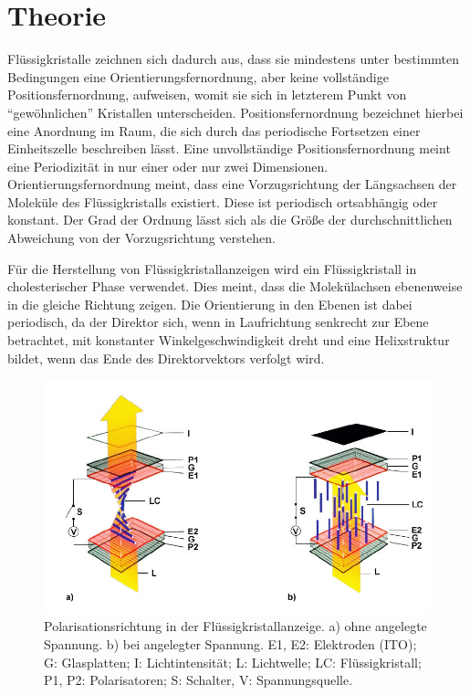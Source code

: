 \documentclass[
	a4paper,
	12pt,
	pagesize,
	ngerman
]{scrartcl}
\begin{document}
	\section{Theorie}
	Flüssigkristalle zeichnen sich dadurch aus, dass sie mindestens unter bestimmten Bedingungen eine Orientierungsfernordnung, aber keine vollständige Positionsfernordnung, aufweisen, womit sie sich in letzterem Punkt von \enquote{gewöhnlichen} Kristallen unterscheiden.
	Positionsfernordnung bezeichnet hierbei eine Anordnung im Raum, die sich durch das periodische Fortsetzen einer Einheitszelle beschreiben lässt.
	Eine unvollständige Positionsfernordnung meint eine Periodizität in nur einer oder nur zwei Dimensionen.
	Orientierungsfernordnung meint, dass eine Vorzugsrichtung der Längsachsen der Moleküle des Flüssigkristalls existiert.
	Diese ist periodisch ortsabhängig oder konstant.
	Der Grad der Ordnung lässt sich als die Größe der durchschnittlichen Abweichung von der Vorzugsrichtung verstehen.

	Für die Herstellung von Flüssigkristallanzeigen wird ein Flüssigkristall in cholesterischer Phase verwendet.
	Dies meint, dass die Molekülachsen ebenenweise in die gleiche Richtung zeigen.
	Die Orientierung in den Ebenen ist dabei periodisch, da der Direktor sich, wenn in Laufrichtung senkrecht zur Ebene betrachtet, mit konstanter Winkelgeschwindigkeit dreht und  eine Helixstruktur bildet, wenn das Ende des Direktorvektors verfolgt wird.
	\begin{figure}[H]
			\includegraphics[width=1\linewidth]{images/displayHelix}
			\caption{
			Polarisationsrichtung in der Flüssigkristallanzeige. a) ohne angelegte Spannung. b) bei angelegter Spannung. E1, E2: Elektroden (ITO); G: Glasplatten; I: Lichtintensität; L: Lichtwelle; LC: Flüssigkristall;
P1, P2: Polarisatoren; S: Schalter, V: Spannungsquelle. \cite{displayHelix}
			}
			\label{fig_displayHelixBild}
	\end{figure}
\end{document}
